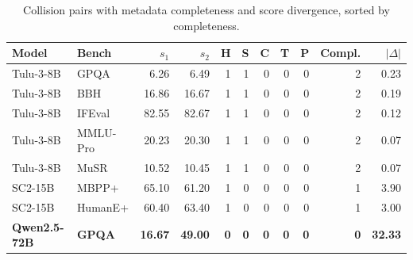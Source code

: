 \begin{table}[t]
\centering
\caption{Collision pairs with metadata completeness and score divergence, sorted by completeness.}
\label{tab:collision_completeness}
\small
\begin{tabular}{llrrrrrrrrr}
\toprule
Model & Bench & $s_1$ & $s_2$ & H & S & C & T & P & Compl. & $|\Delta|$ \\
\midrule
Tulu-3-8B & GPQA & 6.26 & 6.49 & 1 & 1 & 0 & 0 & 0 & 2 & 0.23 \\
Tulu-3-8B & BBH & 16.86 & 16.67 & 1 & 1 & 0 & 0 & 0 & 2 & 0.19 \\
Tulu-3-8B & IFEval & 82.55 & 82.67 & 1 & 1 & 0 & 0 & 0 & 2 & 0.12 \\
Tulu-3-8B & MMLU-Pro & 20.23 & 20.30 & 1 & 1 & 0 & 0 & 0 & 2 & 0.07 \\
Tulu-3-8B & MuSR & 10.52 & 10.45 & 1 & 1 & 0 & 0 & 0 & 2 & 0.07 \\
SC2-15B & MBPP+ & 65.10 & 61.20 & 1 & 0 & 0 & 0 & 0 & 1 & 3.90 \\
SC2-15B & HumanE+ & 60.40 & 63.40 & 1 & 0 & 0 & 0 & 0 & 1 & 3.00 \\
\textbf{Qwen2.5-72B} & \textbf{GPQA} & \textbf{16.67} & \textbf{49.00} & \textbf{0} & \textbf{0} & \textbf{0} & \textbf{0} & \textbf{0} & \textbf{0} & \textbf{32.33} \\
\bottomrule
\end{tabular}
\end{table}